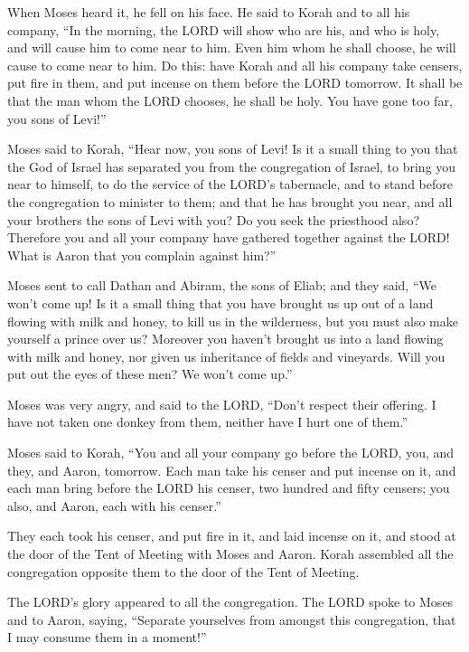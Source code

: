  When Moses heard it, he fell on his face.  He
said to Korah and to all his company, ``In the morning, the LORD will
show who are his, and who is holy, and will cause him to come near to
him. Even him whom he shall choose, he will cause to come near to him.
 Do this: have Korah and all his company take censers,
 put fire in them, and put incense on them before the LORD
tomorrow. It shall be that the man whom the LORD chooses, he shall be
holy. You have gone too far, you sons of Levi!''

 Moses said to Korah, ``Hear now, you sons of Levi!
 Is it a small thing to you that the God of Israel has
separated you from the congregation of Israel, to bring you near to
himself, to do the service of the LORD's tabernacle, and to stand before
the congregation to minister to them;  and that he has
brought you near, and all your brothers the sons of Levi with you? Do
you seek the priesthood also?  Therefore you and all your
company have gathered together against the LORD! What is Aaron that you
complain against him?''

 Moses sent to call Dathan and Abiram, the sons of Eliab;
and they said, ``We won't come up!  Is it a small thing
that you have brought us up out of a land flowing with milk and honey,
to kill us in the wilderness, but you must also make yourself a prince
over us?  Moreover you haven't brought us into a land
flowing with milk and honey, nor given us inheritance of fields and
vineyards. Will you put out the eyes of these men? We won't come up.''

 Moses was very angry, and said to the LORD, ``Don't
respect their offering. I have not taken one donkey from them, neither
have I hurt one of them.''

 Moses said to Korah, ``You and all your company go before
the LORD, you, and they, and Aaron, tomorrow.  Each man
take his censer and put incense on it, and each man bring before the
LORD his censer, two hundred and fifty censers; you also, and Aaron,
each with his censer.''

 They each took his censer, and put fire in it, and laid
incense on it, and stood at the door of the Tent of Meeting with Moses
and Aaron.  Korah assembled all the congregation opposite
them to the door of the Tent of Meeting.

The LORD's glory appeared to all the congregation.  The
LORD spoke to Moses and to Aaron, saying,  ``Separate
yourselves from amongst this congregation, that I may consume them in a
moment!''

